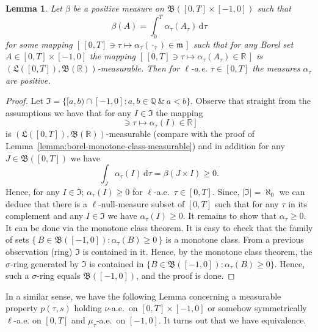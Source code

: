 \documentclass[reqno]{amsart}
\theoremstyle{plain}
\newtheorem{lemma}{Lemma}[section]
\numberwithin{equation}{section}
\numberwithin{definition}{section}
\newcommand\RR{\ensuremath{\mathbb{R}}}
\newcommand\QQ{\ensuremath{\mathbb{Q}}}
\newcommand{\dd}{\ensuremath{\mathrm{d}}}
\begin{document}
\begin{lemma}\label{lemma:desint-positive-is-positive}
    Let $\beta$ be a positive measure on $\mathfrak{B}([0,T]\times[-1,0])$ such that 
    \begin{equation*}
        \beta(A)=\int_{0}^T \alpha_{\tau}(A_\tau) \,\dd \tau
    \end{equation*}
    for some mapping $[\,[0,T]\ni\tau\mapsto \alpha_{\tau}(\cdot _\tau)\in \mathfrak{m}\,]$ such that for any Borel set $A\in [0,T]\times[-1,0]$ the mapping $[\,[0,T]\ni\tau\mapsto \alpha_{\tau}(A_\tau)\in \RR\,]$ is  $(\mathfrak{L}([0, T]), \mathfrak{B}(\RR))$\nobreakdash-\hspace{0pt}measurable. Then for $\ell$-a.e. $\tau\in [0,T]$ the measures $\alpha_{\tau}$ are positive. 
\end{lemma}
\begin{proof}
    Let $\mathfrak{I}=\{ [a,b)\cap [-1,0] : a,b\in\QQ \ \& \ a<b \}$. Observe that straight from the assumptions we have that for any $I\in \mathfrak{I}$
    the mapping 
\begin{equation*}
    [\, [0,T]\ni \tau \mapsto \alpha_{\tau}(I) \in \RR\,]
\end{equation*}
is $(\mathfrak{L}([0, T]), \mathfrak{B}(\RR))$\nobreakdash-\hspace{0pt}measurable (compare with the proof of Lemma~\ref{lemma:borel-monotone-class-measurable}) and in addition for any $J\in \mathfrak{B}([0,T])$ we have 
\begin{equation*}
    \int_{J}\alpha_{\tau}(I) \,\dd \tau = \beta(J\times I)\ge 0. 
\end{equation*} 
Hence, for any $I\in \mathfrak{I}$; $\alpha_{\tau}(I)\ge 0$ for $\ell$-a.e.\ $\tau\in [0,T]$. Since, $|\mathfrak{I}|=\aleph_0$ we can deduce that there is a $\ell$-null-measure subset of $[0,T]$ such that for any $\tau$ in its complement and any $I\in\mathfrak{I}$ we have $\alpha_{\tau}(I)\ge 0$. It remains to show that $\alpha_{\tau}\ge 0$. It can be done via the monotone class theorem. It is easy to check that the family of sets $\{\,B\in\mathfrak{B} ([-1,0]) : \alpha_{\tau}(B)\ge 0 \, \}$ is a monotone class. From a previous observation (ring) $\mathfrak{I}$ is contained in it. Hence, by the monotone class theorem, the $\sigma$-ring generated by $\mathfrak{I}$ is contained in $\{B\in\mathfrak{B} ([-1,0]) : \alpha_{\tau}(B)\ge 0 \}$. Hence, such a $\sigma$-ring equals $\mathfrak{B} ([-1,0])$, and the proof is done.       
\end{proof}
In a similar sense, we have the following Lemma concerning a measurable property ${p}(\tau,s)$ holding $\nu$-a.e.\ on $[0,T]\times [-1,0]$ or somehow symmetrically  $\ell$-a.e.  on $[0,T]$ and $\mu_{\tau}$-a.e.\ on $[-1,0]$. It turns out that we have equivalence. 
\end{document}
